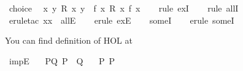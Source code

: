 \begin{isabellebody}
\begin{isamarkuptext}
\end{isamarkuptext}\isamarkuptrue%
\isamarkupfalse%
\ choice{\isacharcolon}{\kern0pt}\isanewline
\ \ {\isachardoublequoteopen}{\isasymforall}x{\isachardot}{\kern0pt}\ {\isasymexists}y{\isachardot}{\kern0pt}\ R\ x\ y\ {\isasymLongrightarrow}\ {\isasymexists}f{\isachardot}{\kern0pt}\ {\isasymforall}x{\isachardot}{\kern0pt}\ R\ x\ {\isacharparenleft}{\kern0pt}f\ x{\isacharparenright}{\kern0pt}{\isachardoublequoteclose}\isanewline
%
\isadelimproof
\ \ %
\endisadelimproof
%
\isatagproof
{}\isamarkupfalse%
\ {\isacharparenleft}{\kern0pt}rule\ exI{\isacharparenright}{\kern0pt}\isanewline
\ \ \isamarkupfalse%
\ {\isacharparenleft}{\kern0pt}rule\ allI{\isacharparenright}{\kern0pt}\isanewline
\ \ \isamarkupfalse%
\ {\isacharparenleft}{\kern0pt}erule{\isacharunderscore}{\kern0pt}tac\ x{\isacharequal}{\kern0pt}x\ \ allE{\isacharparenright}{\kern0pt}\isanewline
\ \ \isamarkupfalse%
\ {\isacharparenleft}{\kern0pt}erule\ exE{\isacharparenright}{\kern0pt}\isanewline
\ \ \isamarkupfalse%
\ someI\isanewline
\ \ \isamarkupfalse%
\ {\isacharparenleft}{\kern0pt}erule\ someI{\isacharparenright}{\kern0pt}\isanewline
\ \ \isamarkupfalse%
%
\endisatagproof
{\isafoldproof}%
%
\isadelimproof
%
\endisadelimproof
%
\isadelimdocument
%
\endisadelimdocument
%
\isatagdocument
%
\isamarkuptrue%
%
\endisatagdocument
{\isafolddocument}%
%
\isadelimdocument
%
\endisadelimdocument
%
\begin{isamarkuptext}%
You can find definition of HOL at %
\end{isamarkuptext}\isamarkuptrue%
%
\begin{isamarkuptext}%
%
\end{isamarkuptext}\isamarkuptrue%
\isamarkupfalse%
\ impE{\isacharcolon}{\kern0pt}\isanewline
\ \ \ PQ{\isacharcolon}{\kern0pt}\ {\isachardoublequoteopen}P\ {\isasymlongrightarrow}\ Q{\isachardoublequoteclose}\isanewline
\ \ \ P{\isacharcolon}{\kern0pt}\ {\isachardoublequoteopen}P{\isachardoublequoteclose}\isanewline

\end{isabellebody}
